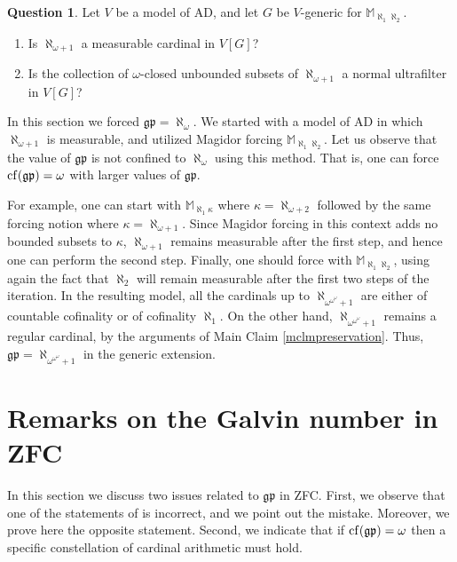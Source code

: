 \documentclass[11pt]{amsart}
\theoremstyle{definition}
\newtheorem{question}[theorem]{Question}
\theoremstyle{remark}
\newcommand{\cf}{{\rm cf}}
\begin{document}
\begin{question}
  \label{qmeasurability} Let $V$ be a model of \textsf{AD}, and let $G$ be $V$-generic for $\mathbb{M}_{\aleph_1\aleph_2}$.
  \begin{enumerate}
    \item [$(\aleph)$] Is $\aleph_{\omega+1}$ a measurable cardinal in $V[G]$?
    \item [$(\beth)$] Is the collection of $\omega$-closed unbounded subsets of $\aleph_{\omega+1}$ a normal ultrafilter in $V[G]$?
  \end{enumerate}
\end{question}

In this section we forced $\mathfrak{gp}=\aleph_\omega$.
We started with a model of \textsf{AD} in which $\aleph_{\omega+1}$ is measurable, and utilized Magidor forcing $\mathbb{M}_{\aleph_1\aleph_2}$.
Let us observe that the value of $\mathfrak{gp}$ is not confined to $\aleph_\omega$ using this method.
That is, one can force $\cf(\mathfrak{gp})=\omega$ with larger values of $\mathfrak{gp}$.

For example, one can start with $\mathbb{M}_{\aleph_1\kappa}$ where $\kappa=\aleph_{\omega+2}$ followed by the same forcing notion where $\kappa=\aleph_{\omega+1}$.
Since Magidor forcing in this context adds no bounded subsets to $\kappa$, $\aleph_{\omega+1}$ remains measurable after the first step, and hence one can perform the second step.
Finally, one should force with $\mathbb{M}_{\aleph_1\aleph_2}$, using again the fact that $\aleph_2$ will remain measurable after the first two steps of the iteration.
In the resulting model, all the cardinals up to $\aleph_{\omega^{\omega^\omega}+1}$ are either of countable cofinality or of cofinality $\aleph_1$.
On the other hand, $\aleph_{\omega^{\omega^\omega}+1}$ remains a regular cardinal, by the arguments of Main Claim \ref{mclmpreservation}.
Thus, $\mathfrak{gp}=\aleph_{\omega^{\omega^\omega}+1}$ in the generic extension.

\newpage

\section{Remarks on the Galvin number in ZFC}

In this section we discuss two issues related to $\mathfrak{gp}$ in \textsf{ZFC}.
First, we observe that one of the statements of \cite{MR4423479} is incorrect, and we point out the mistake.
Moreover, we prove here the opposite statement.
Second, we indicate that if $\cf(\mathfrak{gp})=\omega$ then a specific constellation of cardinal arithmetic must hold.
\end{document}
